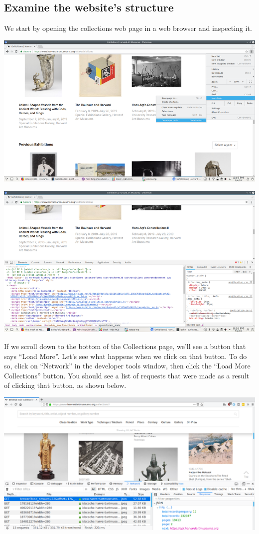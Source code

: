 \documentclass[]{book}
\begin{document}
\hypertarget{examine-the-websites-structure}{%
\subsection{Examine the website's structure}\label{examine-the-websites-structure}}

We start by opening the collections web page in a web browser and
inspecting it.

\includegraphics{Python/PythonWebScrape/images/dev_tools.png}

\includegraphics{Python/PythonWebScrape/images/dev_tools_pane.png}

If we scroll down to the bottom of the Collections page, we'll see a
button that says ``Load More''. Let's see what happens when we click on
that button. To do so, click on ``Network'' in the developer tools
window, then click the ``Load More Collections'' button. You should see
a list of requests that were made as a result of clicking that button,
as shown below.

\includegraphics{Python/PythonWebScrape/images/dev_tools_network.png}
\end{document}
